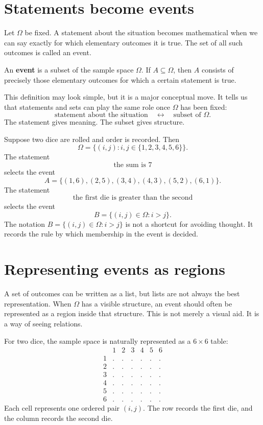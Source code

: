 \section{Statements become events}

Let \(\Omega\) be fixed. A statement about the situation becomes mathematical when we can say exactly for which elementary outcomes it is true. The set of all such outcomes is called an event.

\begin{definitionbox}
An \textbf{event} is a subset of the sample space \(\Omega\). If \(A\subseteq\Omega\), then \(A\) consists of precisely those elementary outcomes for which a certain statement is true.
\end{definitionbox}

This definition may look simple, but it is a major conceptual move. It tells us that statements and sets can play the same role once \(\Omega\) has been fixed:
\[
\text{statement about the situation}
\quad\longleftrightarrow\quad
\text{subset of }\Omega.
\]
The statement gives meaning. The subset gives structure.

\begin{examplebox}
Suppose two dice are rolled and order is recorded. Then
\[
\Omega=\{(i,j): i,j\in\{1,2,3,4,5,6\}\}.
\]
The statement
\[
\text{the sum is }7
\]
selects the event
\[
A=\{(1,6),(2,5),(3,4),(4,3),(5,2),(6,1)\}.
\]
The statement
\[
\text{the first die is greater than the second}
\]
selects the event
\[
B=\{(i,j)\in\Omega:i>j\}.
\]
The notation \(B=\{(i,j)\in\Omega:i>j\}\) is not a shortcut for avoiding thought. It records the rule by which membership in the event is decided.
\end{examplebox}

\section{Representing events as regions}

A set of outcomes can be written as a list, but lists are not always the best representation. When \(\Omega\) has a visible structure, an event should often be represented as a region inside that structure. This is not merely a visual aid. It is a way of seeing relations.

For two dice, the sample space is naturally represented as a \(6\times 6\) table:
\[
\begin{array}{c|cccccc}
 & 1&2&3&4&5&6\\
\hline
1&.&.&.&.&.&.\\
2&.&.&.&.&.&.\\
3&.&.&.&.&.&.\\
4&.&.&.&.&.&.\\
5&.&.&.&.&.&.\\
6&.&.&.&.&.&.
\end{array}
\]
Each cell represents one ordered pair \((i,j)\). The row records the first die, and the column records the second die.

